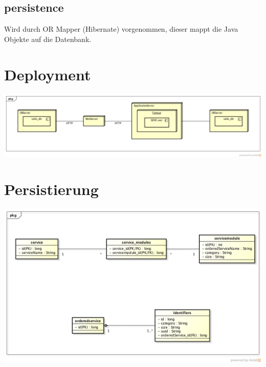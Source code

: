 \documentclass[11pt]{scrartcl}
\begin{document}
\subsection{persistence}

Wird durch OR Mapper (Hibernate) vorgenommen, dieser mappt die Java Objekte auf 
die Datenbank.

\section{Deployment}

\includegraphics[width=\textwidth]{deployment}

\section{Persistierung}

\includegraphics[width=\textwidth]{Datenmodell}
\end{document}
